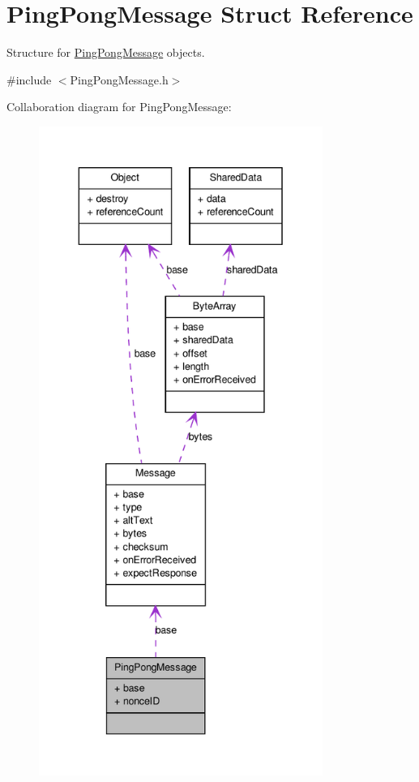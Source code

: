 \hypertarget{struct_ping_pong_message}{
\section{PingPongMessage Struct Reference}
\label{struct_ping_pong_message}
}


Structure for \hyperlink{struct_ping_pong_message}{PingPongMessage} objects.  




{\ttfamily \#include $<$PingPongMessage.h$>$}



Collaboration diagram for PingPongMessage:
\nopagebreak
\begin{figure}[H]
\begin{center}
\leavevmode
\includegraphics[height=600pt]{struct_ping_pong_message__coll__graph}
\end{center}
\end{figure}
